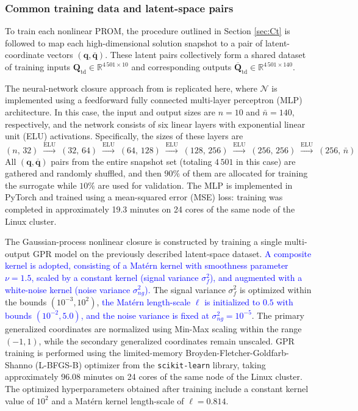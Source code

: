 \documentclass[preprint,10pt]{elsarticle}
\begin{document}
\subsubsection{Common training data and latent-space pairs}

To train each nonlinear PROM, the procedure outlined in Section \ref{sec:Ct} is followed to map each high-dimensional solution snapshot to a pair of latent-coordinate vectors $(\mathbf{q}, \bar {\mathbf{q}})$. These latent pairs collectively form a shared dataset of training inputs $\mathbf{Q}_{\text{td}} \in \mathbb{R}^{4\,501 \times 10}$ and corresponding outputs $\overline{\mathbf{Q}}_{\text{td}} \in \mathbb{R}^{4\,501 \times 140}$.

The neural-network closure approach from \cite{barnett2023neural} is replicated here, where $\mathcal{N}$ is implemented using a feedforward fully connected multi-layer perceptron 
(MLP) architecture. In this case, the input and output sizes are $n=10$ and $\bar{n}=140$, respectively, and the network consists of six linear layers with exponential linear unit 
(ELU) activations. Specifically, the sizes of these layers are
\begin{equation}
  (n,\,32)
  \;\xrightarrow{\text{ELU}}\;
  (32,\,64)
  \;\xrightarrow{\text{ELU}}\;
  (64,\,128)
  \;\xrightarrow{\text{ELU}}\;
  (128,\,256)
  \;\xrightarrow{\text{ELU}}\;
  (256,\,256)
  \;\xrightarrow{\text{ELU}}\;
  (256,\,\bar{n})
\end{equation}
All $(\mathbf{q}, \overline{\mathbf{q}})$ pairs from the entire snapshot set (totaling $4\,501$ in this case) are gathered and 
randomly shuffled, and then $90\%$ of them are allocated for training the surrogate while $10\%$ are used for validation. The MLP is 
implemented in PyTorch and trained using a mean-squared error (MSE) loss: training was completed in approximately 19.3 minutes on 24 
cores of the same node of the Linux cluster.

The Gaussian-process nonlinear closure is constructed by training a single multi-output GPR model on the previously described latent-space dataset.  
\textcolor{blue}{A composite kernel is adopted, consisting of a Mat\'ern kernel with smoothness parameter $\nu=1.5$, scaled by a constant kernel (signal variance $\sigma_f^2$), and augmented with a white-noise kernel (noise variance $\sigma_{ng}^2$).}  
The signal variance $\sigma_f^2$ is optimized within the bounds $(10^{-3},10^{2})$, \textcolor{blue}{the Mat\'ern length-scale $\ell$ is initialized to $0.5$ with bounds $(10^{-2}, 5.0)$, and the noise variance is fixed at $\sigma_{ng}^2=10^{-5}$}. The primary generalized coordinates are normalized using Min-Max scaling within the range $(-1, 1)$, while the secondary generalized coordinates remain unscaled. GPR training is performed using the limited-memory Broyden-Fletcher-Goldfarb-Shanno (L-BFGS-B) optimizer from the \texttt{scikit-learn} library, taking approximately 96.08 minutes on 24 cores of the same node of the Linux cluster. The optimized hyperparameters obtained after training include a constant kernel value of $10^2$ and a Mat\'ern  kernel length-scale of $\ell=0.814$.
\end{document}
